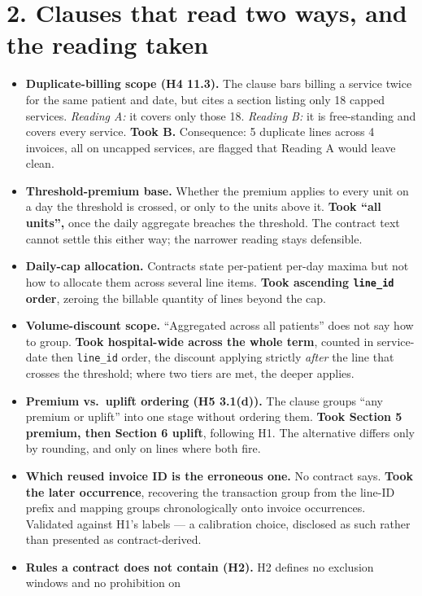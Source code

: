 \documentclass[10pt,a4paper]{article}
\begin{document}
\section*{\normalsize 2.\; Clauses that read two ways, and the reading taken}
\vspace{-4pt}
\begin{itemize}
\item \textbf{Duplicate-billing scope (H4 11.3).} The clause bars billing a service twice for the same
patient and date, but cites a section listing only 18 capped services. \emph{Reading A:} it covers only
those 18. \emph{Reading B:} it is free-standing and covers every service. \textbf{Took B.} Consequence:
5 duplicate lines across 4 invoices, all on uncapped services, are flagged that Reading A would leave clean.
\item \textbf{Threshold-premium base.} Whether the premium applies to every unit on a day the threshold is
crossed, or only to the units above it. \textbf{Took ``all units'',} once the daily aggregate breaches the
threshold. The contract text cannot settle this either way; the narrower reading stays defensible.
\item \textbf{Daily-cap allocation.} Contracts state per-patient per-day maxima but not how to allocate them
across several line items. \textbf{Took ascending \texttt{line\_id} order}, zeroing the billable quantity of
lines beyond the cap.
\item \textbf{Volume-discount scope.} ``Aggregated across all patients'' does not say how to group.
\textbf{Took hospital-wide across the whole term}, counted in service-date then \texttt{line\_id} order, the
discount applying strictly \emph{after} the line that crosses the threshold; where two tiers are met, the
deeper applies.
\item \textbf{Premium vs.\ uplift ordering (H5 3.1(d)).} The clause groups ``any premium or uplift'' into one
stage without ordering them. \textbf{Took Section 5 premium, then Section 6 uplift}, following H1. The
alternative differs only by rounding, and only on lines where both fire.
\item \textbf{Which reused invoice ID is the erroneous one.} No contract says. \textbf{Took the later
occurrence}, recovering the transaction group from the line-ID prefix and mapping groups chronologically onto
invoice occurrences. Validated against H1's labels --- a calibration choice, disclosed as such rather than
presented as contract-derived.
\item \textbf{Rules a contract does not contain (H2).} H2 defines no exclusion windows and no prohibition on

\end{itemize}
\end{document}
